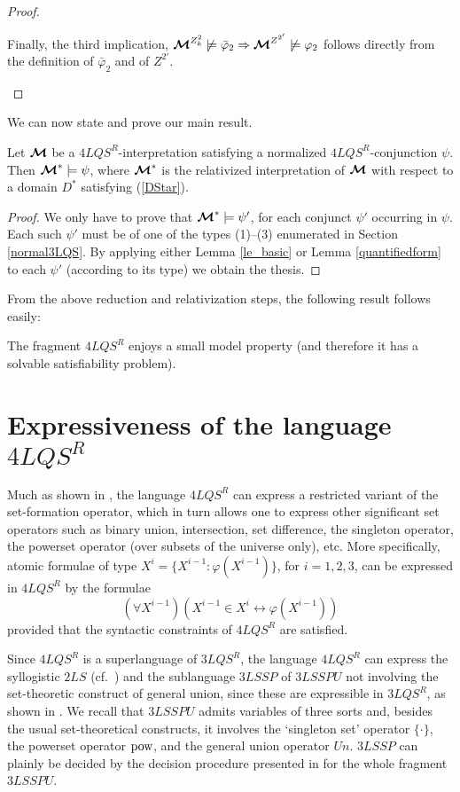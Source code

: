 \documentclass{fundam}
\newcommand{\model}{\ensuremath{\mbox{\boldmath $\mathcal{M}$}}\xspace}
\newcommand{\pow}{\mbox{\rm pow}}
\newcommand{\QLQSR}{\ensuremath{\mbox{$4\mathit{LQS}^{R}$}}\xspace}
\begin{document}
\begin{proof}
\begin{itemize}
\begin{description}
Finally, the third implication, $\model^{Z_k^2}\not\models
\bar{\varphi}_2 \Rightarrow \model^{Z^{2'}}\not\models \varphi_2$
follows directly from the definition of $\bar{\varphi}_2$ and of
$Z^{2'}$.
\end{description}
\end{itemize}
\end{proof}
We can now state and prove our main result.
\begin{theorem}\label{correctness}
Let $\model$ be a $\QLQSR$-interpretation satisfying a normalized
$\QLQSR$-conjunction $\psi$.  Then $\model^*\models \psi$, where
$\model^*$ is the relativized interpretation of $\model$ with respect
to a domain $D^{*}$ satisfying (\ref{DStar}).
\end{theorem}
\begin{proof}
We only have to prove that $\model^*\models \psi'$, for each conjunct
$\psi'$ occurring in $\psi$.  Each such $\psi'$ must be of one of the
types (1)--(3) enumerated in Section \ref{normal3LQS}.  By applying
either Lemma \ref{le_basic} or Lemma \ref{quantifiedform} to each
$\psi'$ (according to its type) we obtain the thesis.
\end{proof}
From the above reduction and relativization steps, the following
result follows easily:
\begin{corollary}
    The fragment $\QLQSR$ enjoys a small model property (and
    therefore it has a solvable satisfiability problem). \end{corollary}





\section{Expressiveness of the language $\QLQSR$}\label{sec:applications}
\label{expressiveness}
Much as shown in \cite{CanNic08}, the language $\QLQSR$ can express a
restricted variant of the set-formation operator, which in turn allows one to
express other significant set operators such as binary union,
intersection, set difference, the singleton operator, the powerset
operator (over subsets of the universe only), etc.  More specifically,
atomic formulae of type $X^{i}=\{X^{i-1} :
\varphi(X^{i-1})\}$, for $i = 1,2,3$, can be expressed in $\QLQSR$ by
the formulae
\[
(\forall X^{i-1})(X^{i-1} \in X^{i} \leftrightarrow
\varphi(X^{i-1}))
\]
provided that the syntactic constraints of $\QLQSR$ are satisfied.


Since $\QLQSR$ is a superlanguage of $\mathit{3LQS^{R}}$, the language
$\QLQSR$ can express the syllogistic $2LS$ (cf.\ \cite{FerOm1978}) and
the sublanguage $3LSSP$ of $3LSSPU$ not involving the set-theoretic
construct of general union, since these are expressible in
$\mathit{3LQS^{R}}$, as shown in \cite{CanNic08}.  We recall that
$3LSSPU$ admits variables of three sorts and, besides the usual
set-theoretical constructs, it involves the `singleton set' operator
$\{\cdot\}$, the powerset operator $\pow$, and the general union
operator $\mathit{Un}$.
$3LSSP$ can plainly be decided by the decision procedure presented in
\cite{CanCut93} for the whole fragment $3LSSPU$.
\end{document}
